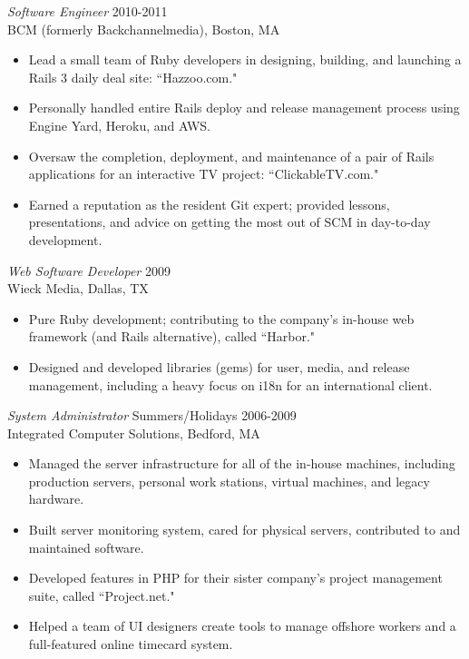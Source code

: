 \documentclass[line,margin]{res}
\begin{document}
\begin{resume}
  {\sl Software Engineer}  \hfill 2010-2011 \\
  BCM (formerly Backchannelmedia),
  Boston, MA
  \begin{itemize}  \itemsep -2pt %
    \item Lead a small team of Ruby developers in designing, building, and launching a Rails 3 daily deal site: ``Hazzoo.com."
    \item Personally handled entire Rails deploy and release management process using Engine Yard, Heroku, and AWS.
    \item Oversaw the completion, deployment, and maintenance of a pair of Rails applications for an interactive TV project: ``ClickableTV.com."
    \item Earned a reputation as the resident Git expert; provided lessons, presentations, and advice on getting the most out of SCM in day-to-day development.
  \end{itemize}

  {\sl Web Software Developer}  \hfill 2009 \\
  Wieck Media,
  Dallas, TX
  \begin{itemize}  \itemsep -2pt %
    \item Pure Ruby development; contributing to the company's in-house web framework (and Rails alternative), called ``Harbor."
    \item Designed and developed libraries (gems) for user, media, and release management, including a heavy focus on i18n for an international client.
  \end{itemize}

  {\sl System Administrator}  \hfill Summers/Holidays 2006-2009 \\
  Integrated Computer Solutions,
  Bedford, MA
  \begin{itemize}  \itemsep -2pt %
       \item Managed the server infrastructure for all of the in-house machines, including production servers, personal work stations, virtual machines, and legacy hardware.
       \item Built server monitoring system, cared for physical servers, contributed to and maintained software.
       \item Developed features in PHP for their sister company's project management suite, called ``Project.net."
       \item Helped a team of UI designers create tools to manage offshore workers and a full-featured online timecard system.
  \end{itemize}


\end{resume}
\end{document}
